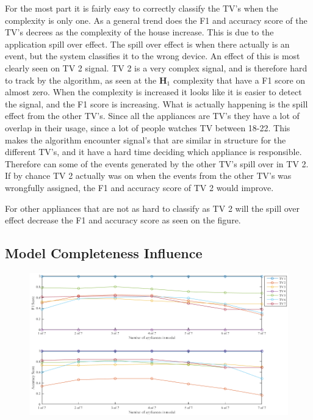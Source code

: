For the most part it is fairly easy to correctly classify the TV's when the complexity is only one. As a general trend does the F1 and accuracy score of the TV's decrees as the complexity of the house increase. This is due to the application spill over effect. The spill over effect is when there actually is an event, but the system classifies it to the wrong device.  An effect of this is most clearly seen on TV 2 signal. TV 2 is a very complex signal, and is therefore hard to track by the algorithm, as seen at the $\textbf{H}_1$ complexity that have a F1 score on almost zero. When the complexity is increased it looks like it is easier to detect the signal, and the F1 score is increasing. What is actually happening is the spill effect from the other TV's. Since all the appliances are TV's they have a lot of overlap in their usage, since a lot of people watches TV between 18-22. This makes the algorithm encounter signal's that are similar in structure for the different TV's, and it have a hard time deciding which appliance is responsible. Therefore can some of the events generated by the other TV's spill over in TV 2. If by chance TV 2 actually was on when the events from the other TV's was wrongfully assigned, the F1 and accuracy score of TV 2 would improve. 

For other appliances that are not as hard to classify as TV 2 will the spill over effect decrease the F1 and accuracy score as seen on the figure. 

\subsection{ Model Completeness Influence }



\begin{figure}[H]
\centering
\includegraphics[width=1\textwidth]{billeder/ModelCompletness.png}
\caption{}
\end{figure}